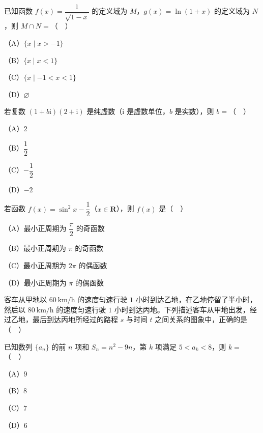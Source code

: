 


\begin{question}
已知函数 $f(x)=\dfrac{1}{\sqrt{1-x}}$ 的定义域为 $M$，$g(x)=\ln(1+x)$ 的定义域为 $N$，则 $M\cap N=$（　）

（A）$\{x\mid x>-1\}$

（B）$\{x\mid x<1\}$

（C）$\{x\mid -1<x<1\}$

（D）$\varnothing$

\end{question}
\begin{question}
若复数 $(1+b\mathrm i)(2+\mathrm i)$ 是纯虚数（$\mathrm i$ 是虚数单位，$b$ 是实数），则 $b=$（　）

（A）$2$

（B）$\dfrac12$

（C）$-\dfrac12$

（D）$-2$

\end{question}
\begin{question}
若函数 $f(x)=\sin^2x-\dfrac12$（$x\in\mathbf R$），则 $f(x)$ 是（　）

（A）最小正周期为 $\dfrac{\pi}{2}$ 的奇函数

（B）最小正周期为 $\pi$ 的奇函数

（C）最小正周期为 $2\pi$ 的偶函数

（D）最小正周期为 $\pi$ 的偶函数

\Needspace{0.4\textheight}
\end{question}
\begingroup
\renewenvironment{question}{\Needspace{0.5\textheight}}{}
\begin{question}
客车从甲地以 $60\ \mathrm{km/h}$ 的速度匀速行驶 $1$ 小时到达乙地，在乙地停留了半小时，然后以 $80\ \mathrm{km/h}$ 的速度匀速行驶 $1$ 小时到达丙地。下列描述客车从甲地出发，经过乙地，最后到达丙地所经过的路程 $s$ 与时间 $t$ 之间关系的图象中，正确的是（　）
\nopagebreak[4]
\begin{center}\end{center}
\nopagebreak[4]
\end{question}
\endgroup
\begin{question}
已知数列 $\{a_n\}$ 的前 $n$ 项和 $S_n=n^2-9n$，第 $k$ 项满足 $5<a_k<8$，则 $k=$（　）

（A）$9$

（B）$8$

（C）$7$

（D）$6$

\Needspace{0.4\textheight}
\end{question}
